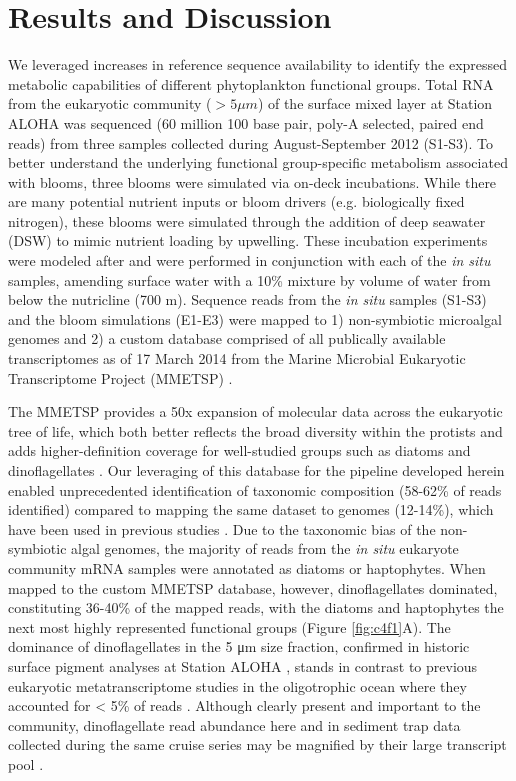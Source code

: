 \section{Results and Discussion}
We leveraged increases in reference sequence availability \citep{Keeling2014} to identify the expressed metabolic capabilities of different phytoplankton functional groups. Total RNA from the eukaryotic community ($>5 \mu m$) of the surface mixed layer at Station ALOHA was sequenced (60 million 100 base pair, poly-A selected, paired end reads) from three samples collected during August-September 2012 (S1-S3). To better understand the underlying functional group-specific metabolism associated with blooms, three blooms were simulated via on-deck incubations. While there are many potential nutrient inputs or bloom drivers (e.g. biologically fixed nitrogen), these blooms were simulated through the addition of deep seawater (DSW) to mimic nutrient loading by upwelling.  These incubation experiments were modeled after \citet{McAndrew2007} and were performed in conjunction with each of the \textit{in situ} samples, amending surface water with a 10\% mixture by volume of water from below the nutricline (700 m). Sequence reads from the \textit{in situ} samples (S1-S3) and the bloom simulations (E1-E3) were mapped to 1) non-symbiotic microalgal genomes and 2) a custom database comprised of all publically available transcriptomes as of 17 March 2014 from the Marine Microbial Eukaryotic Transcriptome Project (MMETSP) \citep{Keeling2014}.\par 
The MMETSP provides a 50x expansion of molecular data across the eukaryotic tree of life, which both better reflects the broad diversity within the protists and adds higher-definition coverage for well-studied groups such as diatoms and dinoflagellates \citep{Keeling2014}. Our leveraging of this database for the pipeline developed herein enabled unprecedented identification of taxonomic composition (58-62\% of reads identified) compared to mapping the same dataset to genomes (12-14\%), which have been used in previous studies \citep{Marchetti2012a}. Due to the taxonomic bias of the non-symbiotic algal genomes, the majority of reads from the \textit{in situ} eukaryote community mRNA samples were annotated as diatoms or haptophytes. When mapped to the custom MMETSP database, however, dinoflagellates dominated, constituting 36-40\% of the mapped reads, with the diatoms and haptophytes the next most highly represented functional groups (Figure \ref{fig:c4f1}A). The dominance of dinoflagellates in the 5 μm size fraction, confirmed in historic surface pigment analyses at Station ALOHA \citep{Letelier1993}, stands in contrast to previous eukaryotic metatranscriptome studies in the oligotrophic ocean where they accounted for < 5\% of reads \citep{Marchetti2012a}. Although clearly present and important to the community, dinoflagellate read abundance here and in sediment trap data collected during the same cruise series \citep{Fontanez2015} may be magnified by their large transcript pool \citep{Moustafa2010, Hackett2004}. \par

